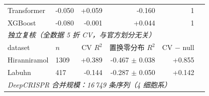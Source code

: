 \begin{table}[htbp]
\begin{tabular}{llrrrr}
Transformer & -0.050 & +0.059 & -0.160 & 1 \\
XGBoost & -0.080 & -0.001 & +0.044 & 1 \\
\midrule
\multicolumn{6}{l}{\textit{独立复核（全数据 5 折 CV，与官方划分无关）}} \\
dataset & $n$ & CV $R^{2}$ & 置换零分布 $R^{2}$ & CV $-$ null & \\
\midrule
Hiranniramol & 1309 & +0.389 & -0.467 $\pm$ 0.038 & +0.855 \\
Labuhn & 417 & -0.144 & -0.287 $\pm$ 0.050 & +0.142 \\
\midrule
\multicolumn{6}{l}{\textit{DeepCRISPR 合并规模：16\,749 条序列（4 细胞系）}} \\
\bottomrule
\end{tabular}
\end{table}
